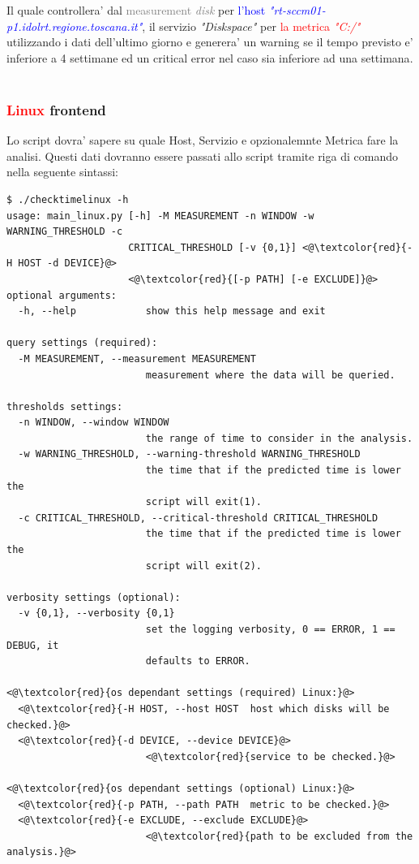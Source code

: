 \documentclass{article}
\begin{document}
Il quale controllera' dal \textcolor{gray}{measurement \textit{disk}} per \textcolor{blue}{l'host \textit{"rt-sccm01-p1.idolrt.regione.toscana.it"}}, \textcolor{green!10!orange!90!}{il servizio \textit{"Diskspace"}} per  \textcolor{red}{la metrica \textit{"C:/"}} utilizzando \textcolor{green!20!blue!80!}{i dati dell'ultimo giorno} e generera' un \textcolor{black!30!green!70!}{warning se il tempo previsto e'  inferiore a 4 settimane} \textcolor{black!30!magenta!70!}{ed un critical error nel caso sia inferiore ad una settimana}.
\\\\

\subsubsection*{\textcolor{red}{Linux} frontend}
Lo script dovra' sapere su quale Host, Servizio e opzionalemnte Metrica fare la analisi.
Questi dati dovranno essere passati allo script tramite riga di comando nella seguente sintassi:
\begin{lstlisting}[]
$ ./checktimelinux -h
usage: main_linux.py [-h] -M MEASUREMENT -n WINDOW -w WARNING_THRESHOLD -c
                     CRITICAL_THRESHOLD [-v {0,1}] <@\textcolor{red}{-H HOST -d DEVICE}@>
                     <@\textcolor{red}{[-p PATH] [-e EXCLUDE]}@>
optional arguments:
  -h, --help            show this help message and exit

query settings (required):
  -M MEASUREMENT, --measurement MEASUREMENT
                        measurement where the data will be queried.

thresholds settings:
  -n WINDOW, --window WINDOW
                        the range of time to consider in the analysis.
  -w WARNING_THRESHOLD, --warning-threshold WARNING_THRESHOLD
                        the time that if the predicted time is lower the
                        script will exit(1).
  -c CRITICAL_THRESHOLD, --critical-threshold CRITICAL_THRESHOLD
                        the time that if the predicted time is lower the
                        script will exit(2).

verbosity settings (optional):
  -v {0,1}, --verbosity {0,1}
                        set the logging verbosity, 0 == ERROR, 1 == DEBUG, it
                        defaults to ERROR.

<@\textcolor{red}{os dependant settings (required) Linux:}@>
  <@\textcolor{red}{-H HOST, --host HOST  host which disks will be checked.}@>
  <@\textcolor{red}{-d DEVICE, --device DEVICE}@>
                        <@\textcolor{red}{service to be checked.}@>

<@\textcolor{red}{os dependant settings (optional) Linux:}@>
  <@\textcolor{red}{-p PATH, --path PATH  metric to be checked.}@>
  <@\textcolor{red}{-e EXCLUDE, --exclude EXCLUDE}@>
                        <@\textcolor{red}{path to be excluded from the analysis.}@>

\end{lstlisting}
\end{document}

